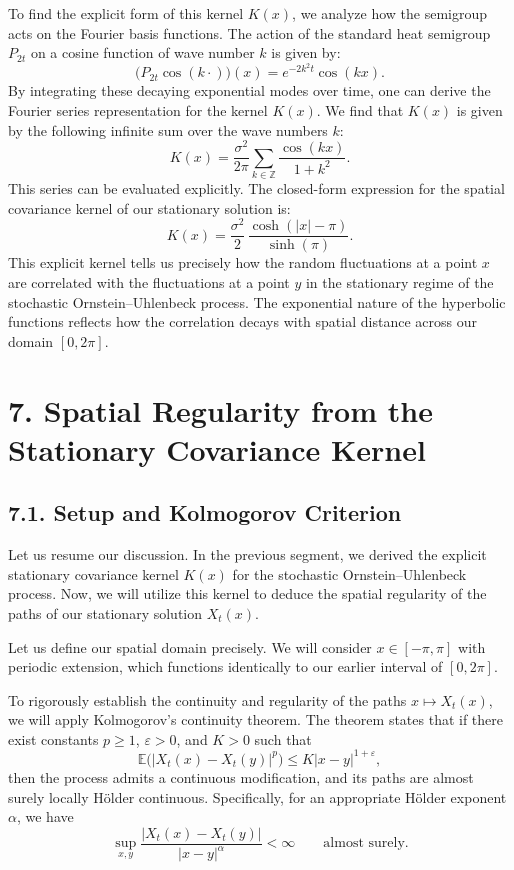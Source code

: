 \documentclass[11pt]{article}
\theoremstyle{definition}
\theoremstyle{remark}
\begin{document}
To find the explicit form of this kernel $K(x)$, we analyze how the semigroup acts on the Fourier basis functions. The action of the standard heat semigroup $P_{2t}$ on a cosine function of wave number $k$ is given by:
\[
\bigl(P_{2t}\cos(k\cdot)\bigr)(x)=e^{-2k^2t}\cos(kx).
\]
By integrating these decaying exponential modes over time, one can derive the Fourier series representation for the kernel $K(x)$. We find that $K(x)$ is given by the following infinite sum over the wave numbers $k$:
\[
K(x)=\frac{\sigma^2}{2\pi}\sum_{k\in\mathbb Z}\frac{\cos(kx)}{1+k^2}.
\]
This series can be evaluated explicitly. The closed-form expression for the spatial covariance kernel of our stationary solution is:
\[
K(x)=\frac{\sigma^2}{2}\,\frac{\cosh(|x|-\pi)}{\sinh(\pi)}.
\]
This explicit kernel tells us precisely how the random fluctuations at a point $x$ are correlated with the fluctuations at a point $y$ in the stationary regime of the stochastic Ornstein--Uhlenbeck process. The exponential nature of the hyperbolic functions reflects how the correlation decays with spatial distance across our domain $[0,2\pi]$.


\section*{7. Spatial Regularity from the Stationary Covariance Kernel}
\subsection*{7.1. Setup and Kolmogorov Criterion}
Let us resume our discussion. In the previous segment, we derived the explicit stationary covariance kernel $K(x)$ for the stochastic Ornstein--Uhlenbeck process. Now, we will utilize this kernel to deduce the spatial regularity of the paths of our stationary solution $X_t(x)$.

Let us define our spatial domain precisely. We will consider $x\in[-\pi,\pi]$ with periodic extension, which functions identically to our earlier interval of $[0,2\pi]$.

To rigorously establish the continuity and regularity of the paths $x\mapsto X_t(x)$, we will apply Kolmogorov's continuity theorem. The theorem states that if there exist constants $p\ge1$, $\varepsilon>0$, and $K>0$ such that
\[
\mathbb E\bigl(|X_t(x)-X_t(y)|^p\bigr)\le K|x-y|^{1+\varepsilon},
\]
then the process admits a continuous modification, and its paths are almost surely locally H\"older continuous. Specifically, for an appropriate H\"older exponent $\alpha$, we have
\[
\sup_{x,y}\frac{|X_t(x)-X_t(y)|}{|x-y|^\alpha}<\infty
\qquad\text{almost surely}.
\]
\end{document}
